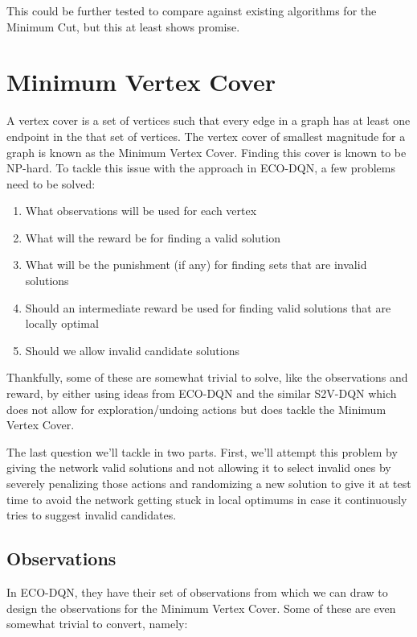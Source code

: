 \documentclass{article}
\begin{document}
This could be further tested to compare against existing algorithms for the Minimum Cut, but this at least shows promise.

\section{Minimum Vertex Cover}

A vertex cover is a set of vertices such that every edge in a graph has at least one endpoint in the that set of vertices. The vertex cover of smallest magnitude for a graph is known as the Minimum Vertex Cover. Finding this cover is known to be NP-hard. To tackle this issue with the approach in ECO-DQN, a few problems need to be solved:

\begin{enumerate}
    \item What observations will be used for each vertex 
    \item What will the reward be for finding a valid solution 
    \item What will be the punishment (if any) for finding sets that are invalid solutions 
    \item Should an intermediate reward be used for finding valid solutions that are locally optimal
    \item Should we allow invalid candidate solutions 
\end{enumerate}

Thankfully, some of these are somewhat trivial to solve, like the observations and reward, by either using ideas from ECO-DQN \cite{eco-dqn} and the similar S2V-DQN \cite{s2v-dqn} which does not allow for exploration/undoing actions but does tackle the Minimum Vertex Cover.

The last question we'll tackle in two parts. First, we'll attempt this problem by giving the network valid solutions and not allowing it to select invalid ones by severely penalizing those actions and randomizing a new solution to give it at test time to avoid the network getting stuck in local optimums in case it continuously tries to suggest invalid candidates.

\subsection{Observations}

In ECO-DQN, they have their set of observations from which we can draw to design the observations for the Minimum Vertex Cover. Some of these are even somewhat trivial to convert, namely:
\end{document}
